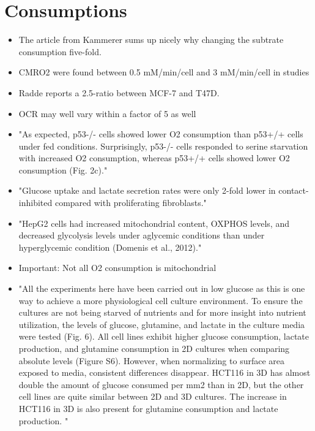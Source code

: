 \documentclass[11pt,a4paper]{article}
\begin{document}
\section{Consumptions}
\begin{itemize}
\item The article from Kammerer sums up nicely why changing the subtrate consumption five-fold.

\item CMRO2 were found between 0.5 mM/min/cell and 3 mM/min/cell in studies \cite{Rhodes1983}\cite{Shalit1972}\cite{Kirsch1978}

\item Radde reports a 2.5-ratio between MCF-7 and T47D.

\item OCR may well vary within a factor of 5 as well 

\item "As expected, p53-/- cells showed lower O2 consumption than p53+/+ cells under fed conditions. Surprisingly, p53-/- cells responded to serine starvation with increased O2 consumption, whereas p53+/+ cells showed lower O2 consumption (Fig. 2c)."\cite{Maddocks2012}

\item "Glucose uptake and lactate secretion rates were only 2-fold lower in contact-inhibited compared with proliferating fibroblasts."\cite{Valcourt2012}

\item "HepG2 cells had increased mitochondrial content, OXPHOS levels, and decreased glycolysis levels under aglycemic conditions than under hyperglycemic condition (Domenis et al., 2012)."\cite{Zhang2023}

\item Important: Not all O2 consumption is mitochondrial

\item "All the experiments here have been carried out in low glucose as this is one way to achieve a more physiological cell culture environment. To ensure the cultures are not being starved of nutrients and for more insight into nutrient utilization, the levels of glucose, glutamine, and lactate in the culture media were tested (Fig. 6). All cell lines exhibit higher glucose consumption, lactate production, and glutamine consumption in 2D cultures when comparing absolute levels (Figure S6). However, when normalizing to surface area exposed to media, consistent differences disappear. HCT116 in 3D has almost double the amount of glucose consumed per mm2 than in 2D, but the other cell lines are quite similar between 2D and 3D cultures. The increase in HCT116 in 3D is also present for glutamine consumption and lactate production. "\cite{Tidwell2022}


\end{itemize}
\end{document}
